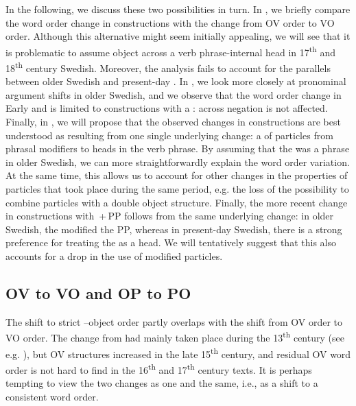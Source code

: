 \documentclass[output=paper]{langscibook}
\begin{document}
In the following, we discuss these two possibilities in turn. In , we briefly compare the word order change in  constructions with the change from OV order to VO order. Although this alternative might seem initially appealing, we will see that it is problematic to assume object  across a verb phrase-internal head in 17\textsuperscript{th} and 18\textsuperscript{th} century Swedish. Moreover, the analysis fails to account for the parallels between older Swedish and present-day . In , we look more closely at pronominal argument shifts in older Swedish, and we observe that the word order change in Early and  is limited to constructions with a :  across negation is not affected. Finally, in , we will propose that the observed changes in  constructions are best understood as resulting from one single underlying change: a  of particles from phrasal modifiers to heads in the verb phrase. By assuming that the  was a phrase in older Swedish, we can more straightforwardly explain the word order variation. At the same time, this allows us to account for other changes in the properties of particles that took place during the same period, e.g. the loss of the possibility to combine  particles with a double object structure. Finally, the more recent change in constructions with \,+\,PP follows from the same underlying change: in older Swedish, the  modified the PP, whereas in present-day Swedish, there is a strong preference for treating the  as a head. We will tentatively suggest that this also accounts for a drop in the use of modified particles.


\subsection{OV to VO and OP to PO}\label{sec:lalu:6.1}

The shift to strict –object order partly overlaps with the shift from OV order to VO order. The change from  had mainly taken place during the 13\textsuperscript{th} century (see e.g. \citealt{Delsing1999}), but OV structures increased in the late 15\textsuperscript{th} century, and residual OV word order is not hard to find in the 16\textsuperscript{th} and 17\textsuperscript{th} century texts. It is perhaps tempting to view the two changes as one and the same, i.e., as a shift to a consistent  word order. 
\end{document}
